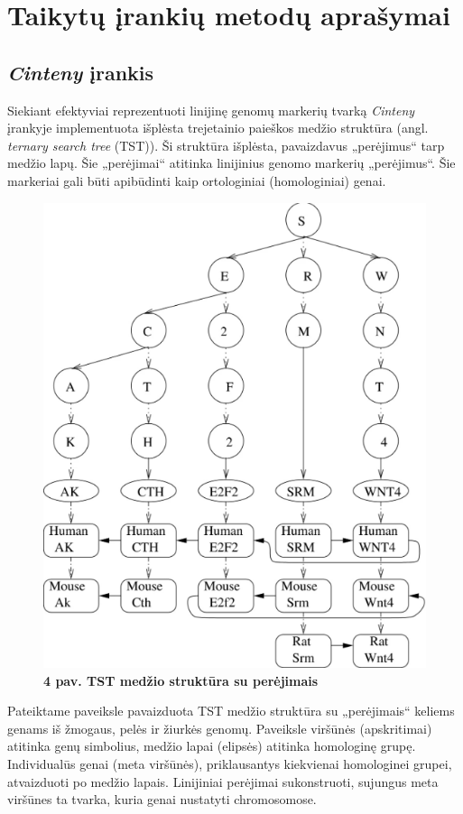 \documentclass[12pt]{article}
\begin{document}
\newpage


\section{Taikytų įrankių metodų aprašymai}
\subsection{\emph{Cinteny} įrankis}
Siekiant efektyviai reprezentuoti linijinę genomų markerių tvarką
\emph{Cinteny}\cite{CINTENY} įrankyje
implementuota išplėsta trejetainio paieškos medžio struktūra \cite{TST}(angl.
\emph{ternary search tree} (TST)). Ši struktūra išplėsta, pavaizdavus 
„perėjimus“ tarp medžio lapų. Šie „perėjimai“ atitinka linijinius genomo
markerių „perėjimus“. Šie markeriai gali būti apibūdinti kaip ortologiniai
(homologiniai) genai.

\begin{figure}[htb]
    \begin{center}
        \includegraphics[width=0.4\linewidth]{../Figures/TTS_data_structure.png}
        \vspace{-0.5\baselineskip}
        \caption*{\small\textbf{4 pav. TST medžio struktūra su perėjimais}}
        \label{fig:birds}
    \end{center}
\end{figure}

Pateiktame paveiksle pavaizduota TST medžio struktūra su „perėjimais“ keliems
genams iš žmogaus, pelės ir žiurkės genomų. Paveiksle viršūnės (apskritimai)
atitinka genų simbolius, medžio lapai (elipsės) atitinka homologinę grupę.
Individualūs genai (meta viršūnės), priklausantys kiekvienai homologinei grupei,
atvaizduoti po medžio lapais. Linijiniai perėjimai sukonstruoti, sujungus meta
viršūnes ta tvarka, kuria genai nustatyti chromosomose.
\end{document}

